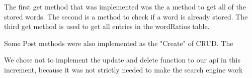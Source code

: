 The first get method that was implemented was the a method to get all of the stored words.
The second is a method to check if a word is already stored.
The third  get method is used to get all entries in the wordRatios table.


Some Post methods were also implemented as the "Create" of CRUD.
The 




We chose not to implement the update and delete function to our api in this increment, 
because it was not strictly needed to make the search engine work



